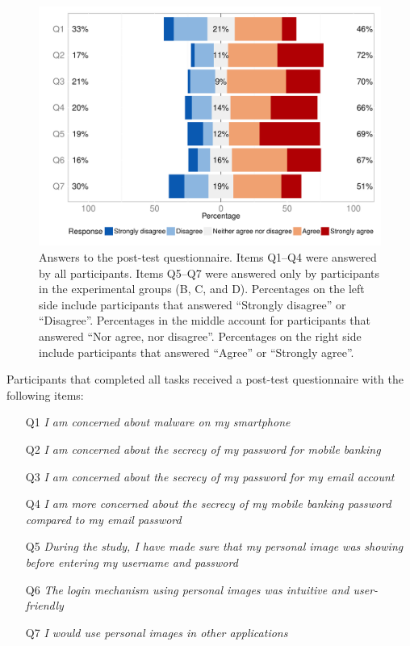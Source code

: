 \begin{figure}[!ht]
	\centering
	\includegraphics[width=.9\linewidth]{figures/securingphone/phishing_composite_likert}
	\caption[Answers to the post-test questionnaire]{
    Answers to the post-test questionnaire.
    Items Q1--Q4 were answered by all participants.
    Items Q5--Q7 were answered only by participants in the experimental groups (B, C, and D).
	Percentages on the left side include participants that answered ``Strongly disagree'' or ``Disagree''.
	Percentages in the middle account for participants that answered ``Nor agree, nor disagree''.
	Percentages on the right side include participants that answered ``Agree'' or ``Strongly agree''.}
	\label{plot:sp_phishing_compositelikert}
\end{figure}


Participants that completed all tasks received a post-test questionnaire with the following items:

\begin{itemize}
\setlength\itemsep{-1.2mm}
\item[Q1]\emph{I am concerned about malware on my smartphone}
\item[Q2]\emph{I am concerned about the secrecy of my password for mobile banking}
\item[Q3]\emph{I am concerned about the secrecy of my password for my email account}
\item[Q4]\emph{I am more concerned about the secrecy of my mobile banking password compared to my email password}
\item[Q5]\emph{During the study, I have made sure that my personal image was showing before entering my username and password}
\item[Q6]\emph{The login mechanism using personal images was intuitive and user-friendly}
\item[Q7]\emph{I would use personal images in other applications}
\end{itemize}


